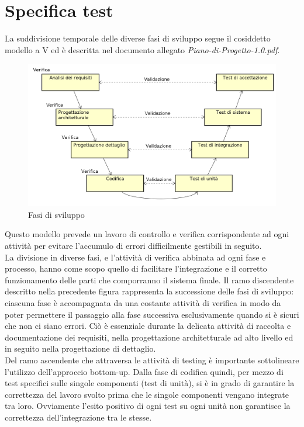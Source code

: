 \documentclass[a4paper,11pt]{article}
\begin{document}
\section{Specifica test}
\label{Appendice B} 
La suddivisione temporale delle diverse fasi di sviluppo segue il cosiddetto modello a V ed è descritta nel documento allegato \textit{Piano-di-Progetto-1.0.pdf}.
\begin{figure}[h!]
\centering
\includegraphics[scale=0.4]{../images/vmodel-final4.png}
\caption{Fasi di sviluppo}
\end{figure} 
Questo modello prevede un lavoro di controllo e verifica corrispondente ad ogni attività per evitare l'accumulo di errori difficilmente gestibili in seguito.\\
La divisione in diverse fasi, e l'attività di verifica abbinata ad ogni fase e processo, hanno come scopo quello di facilitare l'integrazione e il corretto funzionamento delle parti che comporranno il sistema finale.
Il ramo discendente descritto nella precedente figura rappresenta la successione delle fasi di sviluppo: ciascuna fase è accompagnata da una costante attività di verifica in modo da poter permettere il passaggio alla fase successiva esclusivamente quando si è sicuri che non ci siano errori. Ciò è essenziale durante la delicata attività di raccolta e documentazione dei requisiti, nella progettazione architetturale ad alto livello ed in seguito nella progettazione di dettaglio.\\ 
Del ramo ascendente che attraversa le attività di testing è importante sottolineare l'utilizzo dell'approccio bottom-up.
Dalla fase di codifica quindi, per mezzo di test specifici sulle singole componenti (test di unità), si è in grado di garantire la correttezza del lavoro svolto prima che le singole componenti vengano integrate tra loro. Ovviamente l'esito positivo di ogni test su ogni unità non garantisce la correttezza dell'integrazione tra le stesse. \\
\end{document}
